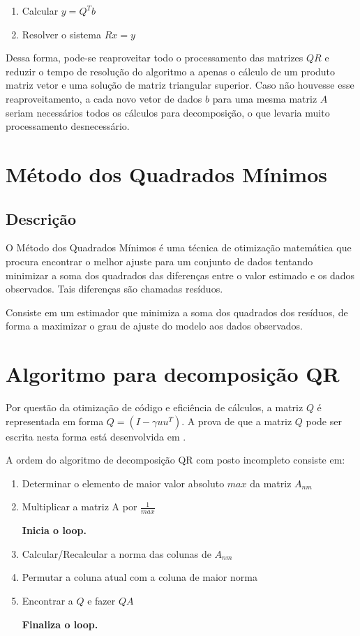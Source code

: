 	\begin{enumerate}
	\item Calcular $y = Q^Tb$
	\item Resolver o sistema $Rx = y$
	\end{enumerate}
	
	Dessa forma, pode-se reaproveitar todo o processamento das matrizes $QR$ e reduzir o tempo de resolução do algoritmo
	a apenas o cálculo de um produto matriz vetor e uma solução de matriz triangular superior.
	Caso não houvesse esse reaproveitamento, a cada novo vetor de dados $b$ para uma mesma matriz $A$ seriam necessários todos os cálculos para decomposição, o que levaria muito processamento desnecessário.
\chapter{Método dos Quadrados Mínimos}

	\section{Descrição}
	O Método dos Quadrados Mínimos é uma técnica de otimização matemática que procura encontrar o melhor ajuste para um 
	conjunto de dados tentando minimizar a soma dos quadrados das diferenças entre o valor estimado e os dados observados.
	Tais diferenças são chamadas resíduos.
	
	
	Consiste em um estimador que minimiza a soma dos quadrados dos resíduos, de forma a maximizar o grau de ajuste do modelo aos dados observados.\cite{wikipedia}



\chapter{Algoritmo para decomposição QR}
Por questão da otimização de código e eficiência de cálculos, a matriz $Q$ é representada em forma $Q = (I - \gamma uu^T)$. A prova de que a matriz $Q$ pode ser escrita nesta forma está desenvolvida em \cite{watkins}.

A ordem do algoritmo de decomposição QR com posto incompleto consiste em:
\begin{enumerate}
	\item Determinar o elemento de maior valor absoluto $max$ da matriz $A_{nm}$
	\item Multiplicar a matriz A por $\frac{1}{max}$ 
	
	\textbf{Inicia o loop.}
	  \item Calcular/Recalcular a norma das colunas de $A_{nm}$
	  \item Permutar a coluna atual com a coluna de maior norma
	  \item Encontrar a $Q$ e fazer $QA$
	  
	\textbf{Finaliza o loop.}
\end{enumerate}

